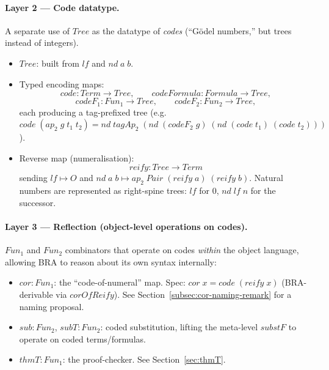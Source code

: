 \documentclass[11pt]{article}
\begin{document}
\paragraph{Layer 2 --- Code datatype.}
A separate use of $\mathit{Tree}$ as the datatype of \emph{codes}
(``G\"odel numbers,'' but trees instead of integers).
\begin{itemize}
  \item $\mathit{Tree}$: built from $\mathit{lf}$ and $\mathit{nd}\;a\;b$.
  \item Typed encoding maps:
    \[
      \mathit{code} : \mathit{Term} \to \mathit{Tree}, \qquad
      \mathit{codeFormula} : \mathit{Formula} \to \mathit{Tree},
    \]
    \[
      \mathit{codeF}_1 : \mathit{Fun}_1 \to \mathit{Tree}, \qquad
      \mathit{codeF}_2 : \mathit{Fun}_2 \to \mathit{Tree},
    \]
    each producing a tag-prefixed tree (e.g.\
    $\mathit{code}\;(\mathit{ap}_2\;g\;t_1\;t_2) =
     \mathit{nd}\;\mathit{tagAp}_2\;(\mathit{nd}\;(\mathit{codeF}_2\;g)\;
        (\mathit{nd}\;(\mathit{code}\;t_1)\;(\mathit{code}\;t_2)))$).
  \item Reverse map (numeralisation):
    \[
      \mathit{reify} : \mathit{Tree} \to \mathit{Term}
    \]
    sending $\mathit{lf} \mapsto O$ and
    $\mathit{nd}\;a\;b \mapsto \mathit{ap}_2\;\mathit{Pair}\;(\mathit{reify}\;a)\;(\mathit{reify}\;b)$.
    Natural numbers are represented as right-spine trees:
    $\mathit{lf}$ for $0$, $\mathit{nd}\;\mathit{lf}\;n$ for the successor.
\end{itemize}

\paragraph{Layer 3 --- Reflection (object-level operations on codes).}
$\mathit{Fun}_1$ and $\mathit{Fun}_2$ combinators that operate on codes
\emph{within} the object language, allowing BRA to reason about its
own syntax internally:
\begin{itemize}
  \item $\mathit{cor} : \mathit{Fun}_1$: the ``code-of-numeral'' map.
        Spec: $\mathit{cor}\;x = \mathit{code}\;(\mathit{reify}\;x)$
        (BRA-derivable via $\mathit{corOfReify}$).  See
        Section~\ref{subsec:cor-naming-remark} for a naming proposal.
  \item $\mathit{sub} : \mathit{Fun}_2$, $\mathit{subT} : \mathit{Fun}_2$:
        coded substitution, lifting the meta-level $\mathit{substF}$
        to operate on coded terms/formulas.
  \item $\mathit{thmT} : \mathit{Fun}_1$: the proof-checker.  See
        Section~\ref{sec:thmT}.
\end{itemize}
\end{document}
